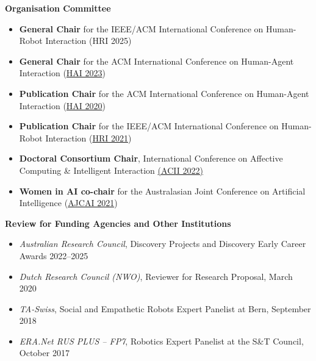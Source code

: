\textbf{Organisation Committee}
\begin{itemize}[nosep]
    \item \textbf{General Chair} for the  IEEE/ACM International Conference on Human-Robot Interaction (HRI 2025)
    \item \textbf{General Chair} for the  ACM International Conference on Human-Agent Interaction (\href{http://hai-conference.net/hai2023/}{HAI 2023})
    \item \textbf{Publication Chair} for the  ACM International Conference on Human-Agent Interaction (\href{http://hai-conference.net/hai2020/}{HAI 2020})
    \item \textbf{Publication Chair} for the IEEE/ACM International Conference on Human-Robot Interaction (\href{https://humanrobotinteraction.org/2021/}{HRI 2021})
    \item \textbf{Doctoral Consortium Chair},  International Conference on Affective Computing \& Intelligent Interaction \href{https://acii-conf.net/2022/calls/call-for-doctoral-consortium/}{(ACII 2022)}
    \item \textbf{Women in AI co-chair} for the  Australasian Joint Conference on Artificial Intelligence (\href{http://www.ajcai2021.net/}{AJCAI 2021})
\end{itemize}

\textbf{Review for Funding Agencies and Other Institutions}
\begin{itemize}
    \item[$\circ$] \emph{Australian Research Council}, Discovery Projects and Discovery Early Career Awards 2022--2025
    \item[$\circ$] \emph{Dutch Research Council (NWO)}, Reviewer for Research Proposal, March 2020
    \item[$\circ$] \emph{TA-Swiss}, Social and Empathetic Robots Expert Panelist at Bern, September 2018
    \item[$\circ$] \emph{ERA.Net RUS PLUS -- FP7}, Robotics Expert Panelist at the S\&T Council, October 2017
\end{itemize}


